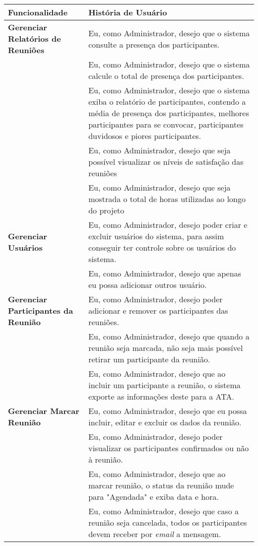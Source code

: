 \begin{table}[H]
	\begin{tabular}{|p{5.0cm}|p{10.0cm}|} 
	\hline
	\textbf{Funcionalidade} & \textbf{História de Usuário} \\ \hline
	\textbf{Gerenciar Relatórios de Reuniões} & Eu, como Administrador, desejo que o sistema consulte a presença dos participantes. \\ \hline
	& Eu, como Administrador, desejo que o sistema calcule o total de presença dos participantes. \\ \hline
	& Eu, como Administrador, desejo que o sistema exiba o relatório de participantes, contendo a média de presença dos participantes, melhores participantes para se convocar, participantes duvidosos e piores participantes. \\ \hline
	& Eu, como Administrador, desejo que seja possível visualizar os níveis de satisfação das reuniões \\ \hline
	& Eu, como Administrador, desejo que seja mostrada o total de horas utilizadas ao longo do projeto \\ \hline
	\textbf{Gerenciar Usuários} & Eu, como Administrador, desejo poder criar e excluir usuários do sistema, para assim conseguir ter controle sobre os usuários do sistema. \\ \hline
	& Eu, como Administrador, desejo que apenas eu possa adicionar outros usuário. \\ \hline
	\textbf{Gerenciar Participantes da Reunião} &  Eu, como Administrador, desejo poder adicionar e remover os participantes das reuniões. \\ \hline
	& Eu, como Administrador, desejo que quando a reunião seja marcada, não seja mais possível retirar um participante da reunião. \\ \hline
	& Eu, como Administrador, desejo que ao incluir um participante a reunião, o sistema exporte as informações deste para a ATA. \\ \hline
	\textbf{Gerenciar Marcar Reunião} & Eu, como Administrador, desejo que eu possa incluir, editar e excluir os dados da reunião. \\ \hline
	& Eu, como Administrador, desejo poder visualizar os participantes confirmados ou não à reunião. \\ \hline
	& Eu, como Administrador, desejo que ao marcar reunião, o status da reunião mude para "Agendada" e exiba data e hora. \\ \hline
	& Eu, como Administrador, desejo que caso a reunião seja cancelada, todos os participantes devem receber por \textit{email} a mensagem. \\ \hline

\end{tabular}
\end{table}
